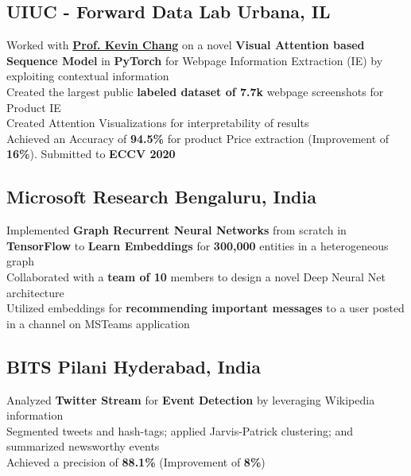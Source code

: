 \documentclass[]{Keval-resume}
\begin{document}
\subsection{UIUC - Forward Data Lab \hfill \normalfont U\lowercase{rbana}, IL}
\textbullet{} Worked with \href{http://www.forwarddatalab.org/kevinccchang}{\textbf{Prof. Kevin Chang}} on a  novel \textbf{Visual Attention based Sequence Model} in \textbf{PyTorch} for Webpage Information Extraction (IE) by exploiting contextual information \\
\textbullet{} Created the largest public \textbf{labeled dataset of 7.7k} webpage screenshots for Product IE \\
\textbullet{} Created Attention Visualizations for interpretability of results \\
\textbullet{} Achieved an Accuracy of \textbf{94.5\%} for product Price extraction (Improvement of \textbf{16\%}). Submitted to \textbf{ECCV 2020}
\sectionsep

\subsection{Microsoft Research \hfill \normalfont B\lowercase{engaluru}, I\lowercase{ndia}}
\textbullet{} Implemented \textbf{Graph Recurrent Neural Networks} from scratch in \textbf{TensorFlow} to \textbf{Learn Embeddings} for \textbf{300,000} entities in a heterogeneous graph \\
\textbullet{} Collaborated with a \textbf{team of 10} members to design a novel Deep Neural Net architecture \\
\textbullet{} Utilized embeddings for \textbf{recommending important messages} to a user posted in a channel on MSTeams application
\sectionsep

\subsection{BITS Pilani \hfill \normalfont H\lowercase{yderabad}, I\lowercase{ndia}}
\textbullet{} Analyzed \textbf{Twitter Stream} for \textbf{Event Detection} by leveraging Wikipedia information\\
\textbullet{} Segmented tweets and hash-tags; applied Jarvis-Patrick clustering; and summarized newsworthy events\\
\textbullet{} Achieved a precision of \textbf{88.1\%} (Improvement of \textbf{8\%})
\sectionsep
\end{document}
